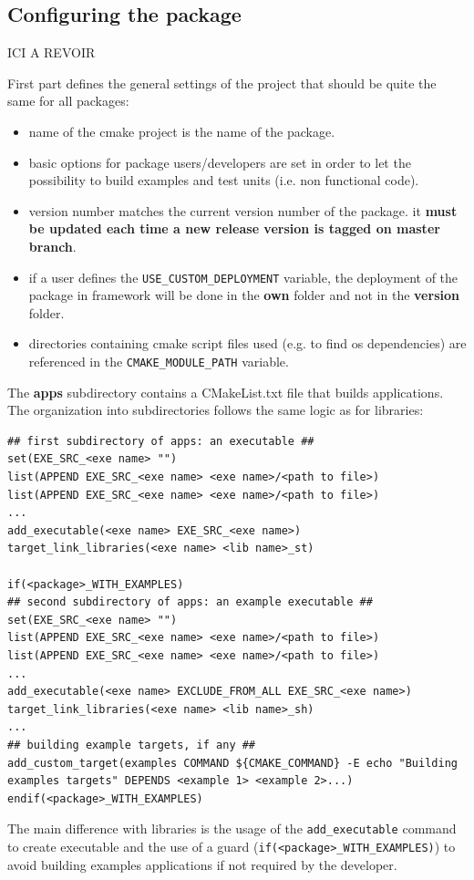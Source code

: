\documentclass[12pt,a4paper]{article}
\begin{document}
\subsection{Configuring the package}
\label{sec:rootCMakeConfig}


ICI A REVOIR

First part defines the general settings of the project that should be quite the same for all packages:
\begin{itemize}
\item name of the cmake project is the name of the package.
\item basic options for package users/developers are set in order to let the possibility to build examples and test units (i.e. non functional code).
\item version number matches the current version number of the package. it \textbf{must be updated each time a new release version is tagged on master branch}.
\item if a user defines the \verb|USE_CUSTOM_DEPLOYMENT| variable, the deployment of the package in framework will be done in the \textbf{own} folder and not in the \textbf{version} folder.
\item directories containing cmake script files used (e.g. to find os dependencies) are referenced in the \verb|CMAKE_MODULE_PATH| variable. 
\end{itemize}


The \textbf{apps} subdirectory contains a CMakeList.txt file that builds applications. The organization into subdirectories follows the same logic as for libraries:
\begin{verbatim}
## first subdirectory of apps: an executable ##
set(EXE_SRC_<exe name> "")
list(APPEND EXE_SRC_<exe name> <exe name>/<path to file>)
list(APPEND EXE_SRC_<exe name> <exe name>/<path to file>)
...
add_executable(<exe name> EXE_SRC_<exe name>)
target_link_libraries(<exe name> <lib name>_st)

if(<package>_WITH_EXAMPLES)
## second subdirectory of apps: an example executable ##
set(EXE_SRC_<exe name> "")
list(APPEND EXE_SRC_<exe name> <exe name>/<path to file>)
list(APPEND EXE_SRC_<exe name> <exe name>/<path to file>)
...
add_executable(<exe name> EXCLUDE_FROM_ALL EXE_SRC_<exe name>)
target_link_libraries(<exe name> <lib name>_sh)
...
## building example targets, if any ##
add_custom_target(examples COMMAND ${CMAKE_COMMAND} -E echo "Building 
examples targets" DEPENDS <example 1> <example 2>...)
endif(<package>_WITH_EXAMPLES)

\end{verbatim}
The main difference with libraries is the usage of the \verb|add_executable| command to create executable and the use of a guard (\verb|if(<package>_WITH_EXAMPLES)|) to avoid building examples applications if not required by the developer.
\end{document}
